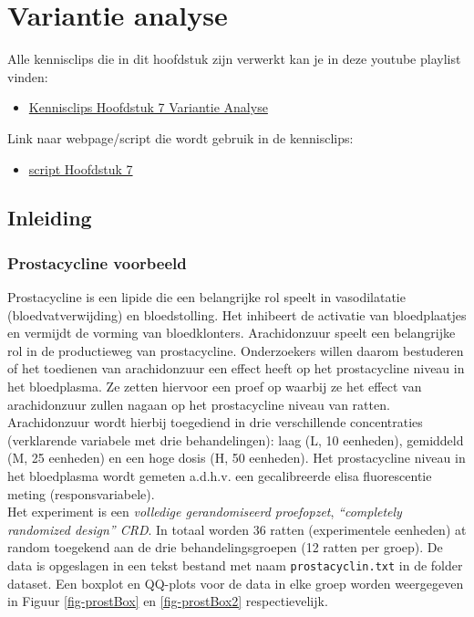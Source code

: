 \documentclass[
  dutch,
  letterpaper,
  12pt]{book}
\providecommand{\tightlist}{%
  \setlength{\itemsep}{0pt}\setlength{\parskip}{0pt}}
\theoremstyle{definition}
\theoremstyle{definition}
\theoremstyle{definition}
\theoremstyle{remark}
\begin{document}
\chapter{Variantie analyse}\label{sec-chap-anova}

Alle kennisclips die in dit hoofdstuk zijn verwerkt kan je in deze
youtube playlist vinden:

\begin{itemize}
\tightlist
\item
  \href{https://www.youtube.com/playlist?list=PLZH1hP8_LbJIBVGNQ61zxMgc2srezPpnB}{Kennisclips
  Hoofdstuk 7 Variantie Analyse}
\end{itemize}

Link naar webpage/script die wordt gebruik in de kennisclips:

\begin{itemize}
\tightlist
\item
  \href{https://statomics.github.io/sbc/rmd/07-Anova.html}{script
  Hoofdstuk 7}
\end{itemize}

\section{Inleiding}\label{inleiding-6}

\subsection{Prostacycline voorbeeld}\label{prostacycline-voorbeeld}

Prostacycline is een lipide die een belangrijke rol speelt in
vasodilatatie (bloedvatverwijding) en bloedstolling. Het inhibeert de
activatie van bloedplaatjes en vermijdt de vorming van bloedklonters.
Arachidonzuur speelt een belangrijke rol in de productieweg van
prostacycline. Onderzoekers willen daarom bestuderen of het toedienen
van arachidonzuur een effect heeft op het prostacycline niveau in het
bloedplasma. Ze zetten hiervoor een proef op waarbij ze het effect van
arachidonzuur zullen nagaan op het prostacycline niveau van ratten.
Arachidonzuur wordt hierbij toegediend in drie verschillende
concentraties (verklarende variabele met drie behandelingen): laag (L,
10 eenheden), gemiddeld (M, 25 eenheden) en een hoge dosis (H, 50
eenheden). Het prostacycline niveau in het bloedplasma wordt gemeten
a.d.h.v. een gecalibreerde elisa fluorescentie meting
(responsvariabele).\\
Het experiment is een \emph{volledige gerandomiseerd proefopzet},
\emph{``completely randomized design'' CRD}. In totaal worden 36 ratten
(experimentele eenheden) at random toegekend aan de drie
behandelingsgroepen (12 ratten per groep). De data is opgeslagen in een
tekst bestand met naam \texttt{prostacyclin.txt} in de folder dataset.
Een boxplot en QQ-plots voor de data in elke groep worden weergegeven in
Figuur \ref{fig-prostBox} en \ref{fig-prostBox2} respectievelijk.
\end{document}
